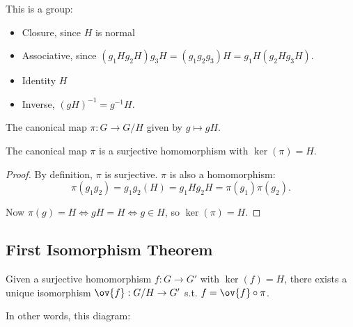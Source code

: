 This is a group:
\begin{itemize}
    \item Closure, since $H$ is normal
    \item Associative, since $(g_1Hg_2H)g_3H = (g_1g_2g_3)H = g_1H(g_2Hg_3H)$.
    \item Identity $H$
    \item Inverse, $(gH)^{-1} = g^{-1}H$. 
\end{itemize}

\begin{definition}

The \ac{canonical map} $\pi : G\rightarrow G/H$ given by $g\mapsto gH$. 
\end{definition}

\begin{theorem}
\thmlabel

The canonical map $\pi$ is a surjective homomorphism with $\ker(\pi)=H$. 
\end{theorem}

\begin{proof}
By definition, $\pi$ is surjective. $\pi$ is also a homomorphism: 
\[\pi(g_1g_2) = g_1g_2(H) = g_1Hg_2H = \pi(g_1)\pi(g_2).\]

Now $\pi(g)=H\iff gH=H\iff g\in H$, so $\ker(\pi)=H$. 
\end{proof}

\subsection{First Isomorphism Theorem}

\begin{theorem}

Given a surjective homomorphism $f : G\rightarrow G'$ with $\ker(f) = H$, there exists a unique isomorphism $\ov{f} : G/H\rightarrow G'$ s.t. $f = \ov{f}\circ \pi$. 
\end{theorem}

In other words, this diagram:
\begin{center}
\end{center}

